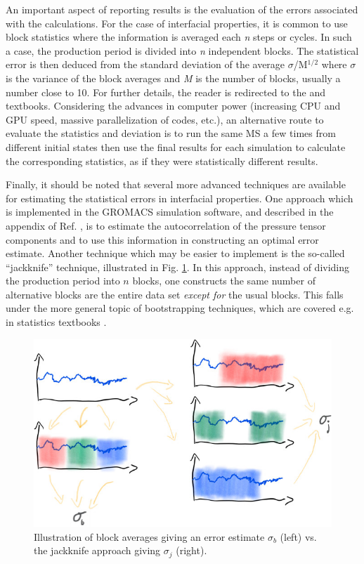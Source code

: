 \documentclass[9pt,bestpractices]{livecoms}
\begin{document}
An important aspect of reporting results is the evaluation of the errors
associated with the calculations. For the case of interfacial properties, it is
common to use block statistics where the information is averaged each
\textit{n} steps or cycles. In such a case, the production period is divided
into \textit{n} independent blocks. The statistical error is then deduced from
the standard deviation of the average ${\sigma}$/M$^{\mathrm{1/2}}$ where
${\sigma}$ is the variance of the block averages and \textit{M} is the number
of blocks, usually a number close to 10. For further details, the reader is
redirected to the \citet{allen2017}
and \citet{frenkel2002}
textbooks. Considering the advances in computer power (increasing CPU and GPU speed,
massive parallelization of codes, etc.), an alternative route to evaluate the
statistics and deviation is to run the same MS a few times from different
initial states then use the final results for each simulation to calculate the
corresponding statistics, as if they were statistically different results.

Finally, it should be noted that several more advanced techniques are available
for estimating the statistical errors in interfacial properties. One approach
which is implemented in the GROMACS simulation software, and described in the
appendix of Ref. \citep{hess2002}, is to estimate the autocorrelation of the
pressure tensor components and to use this information in constructing an
optimal error estimate. Another technique which may be easier to implement is
the so-called ``jackknife'' technique, illustrated in Fig. \ref{fig:jackknife}.
In this approach, instead of dividing the production period into $n$ blocks,
one constructs the same number of alternative blocks are the entire data set
\emph{except for} the usual blocks.  This falls under the more general topic of
bootstrapping techniques, which are covered e.g. in statistics textbooks \citep{efron1982}.

\begin{figure}
	\centering
  \includegraphics[width=\linewidth]{gfx/fig_jackknife.jpeg}
  \caption{Illustration of block averages giving an error estimate $\sigma_b$ (left) vs. the jackknife approach giving $\sigma_j$ (right).}
\label{fig:jackknife}
\end{figure}
\end{document}

